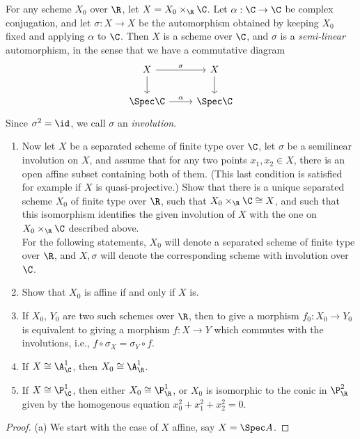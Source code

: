 \begin{exercise}
	For any scheme $X_0$ over $\R $, let $X = X_0 \times_{\R} \C$. Let $\alpha:\C\to\C$ be complex conjugation, and let $\sigma: X \to X$ be the automorphism obtained by keeping $X_0$ fixed and applying $\alpha$ to $\C $. Then $X$ is a scheme over $\C$, and $\sigma$ is a \textit{semi-linear} automorphism, in the sense that we have a commutative diagram
	\[
	\begin{tikzcd}
	X & X\\
	\Spec \C & \Spec \C
	\arrow["\sigma",from=1-1,to=1-2]
	\arrow[from=1-1,to=2-1]
	\arrow["\alpha",from=2-1,to=2-2]
	\arrow[from=1-2,to=2-2]
	\end{tikzcd}
	\]
	Since $\sigma^2 = \id$, we call $\sigma$ an \textit{involution}.
	\begin{enumerate}
		\item Now let $X$ be a separated scheme of finite type over $\C$, let $\sigma$ be a semilinear involution on $X$, and assume that for any two points $x_{1},x_{2}\in X $, there is an open affine subset containing both of them. (This last condition is satisfied for example if $X$ is quasi-projective.) Show that there is a unique separated scheme $X_0$ of finite type over $\R$, such that $X_0 \times _{\R} \C \cong X$, and such that this isomorphism identifies the given involution of $X$ with the one on $X_0 \times _{\R} \C$ described above.\\
		For the following statements, $X_0$ will denote a separated scheme of finite type over $\R$, and $X,\sigma$ will denote the corresponding scheme with involution over $\C$. 
		\item Show that $X_0$ is affine if and only if $X$ is.
		\item If $X_0$, $Y_{0} $ are two such schemes over $\R$, then to give a morphism $f_{0}:X_{0}\to Y_{0} $ is equivalent to giving a morphism $f:X \to Y$ which commutes with the involutions, i.e., $f \circ \sigma_X = \sigma_Y \circ f $.
		\item If $X \cong \A_{\C}^1 $, then $X_{0} \cong \A_{\R}^1 $.
		\item If $X\cong \P_{\C}^1 $, then either $X_{0} \cong \P_{\R}^1 $, or $X_{0} $ is isomorphic to the conic in $\P_{\R}^2 $ given by the homogenous equation $x_{0}^2+x_{1}^2+x_{2}^2=0 $.
\end{enumerate}
\end{exercise}
\begin{proof}
	(a) We start with the case of $X $ affine, say $X= \Spec A $.
\end{proof}

